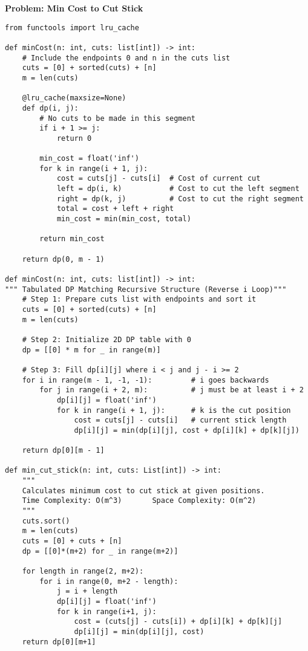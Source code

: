 \noindent\textbf{Problem: Min Cost to Cut Stick}
\begin{verbatim}
from functools import lru_cache

def minCost(n: int, cuts: list[int]) -> int:
    # Include the endpoints 0 and n in the cuts list
    cuts = [0] + sorted(cuts) + [n]
    m = len(cuts)

    @lru_cache(maxsize=None)
    def dp(i, j):
        # No cuts to be made in this segment
        if i + 1 >= j:
            return 0

        min_cost = float('inf')
        for k in range(i + 1, j):
            cost = cuts[j] - cuts[i]  # Cost of current cut
            left = dp(i, k)           # Cost to cut the left segment
            right = dp(k, j)          # Cost to cut the right segment
            total = cost + left + right
            min_cost = min(min_cost, total)

        return min_cost

    return dp(0, m - 1)

def minCost(n: int, cuts: list[int]) -> int:
""" Tabulated DP Matching Recursive Structure (Reverse i Loop)"""
    # Step 1: Prepare cuts list with endpoints and sort it
    cuts = [0] + sorted(cuts) + [n]
    m = len(cuts)

    # Step 2: Initialize 2D DP table with 0
    dp = [[0] * m for _ in range(m)]

    # Step 3: Fill dp[i][j] where i < j and j - i >= 2
    for i in range(m - 1, -1, -1):         # i goes backwards
        for j in range(i + 2, m):          # j must be at least i + 2
            dp[i][j] = float('inf')
            for k in range(i + 1, j):      # k is the cut position
                cost = cuts[j] - cuts[i]   # current stick length
                dp[i][j] = min(dp[i][j], cost + dp[i][k] + dp[k][j])

    return dp[0][m - 1]

def min_cut_stick(n: int, cuts: List[int]) -> int:
    """
    Calculates minimum cost to cut stick at given positions.
    Time Complexity: O(m^3)       Space Complexity: O(m^2)
    """
    cuts.sort()
    m = len(cuts)
    cuts = [0] + cuts + [n]
    dp = [[0]*(m+2) for _ in range(m+2)]
    
    for length in range(2, m+2):
        for i in range(0, m+2 - length):
            j = i + length
            dp[i][j] = float('inf')
            for k in range(i+1, j):
                cost = (cuts[j] - cuts[i]) + dp[i][k] + dp[k][j]
                dp[i][j] = min(dp[i][j], cost)
    return dp[0][m+1]
\end{verbatim}

